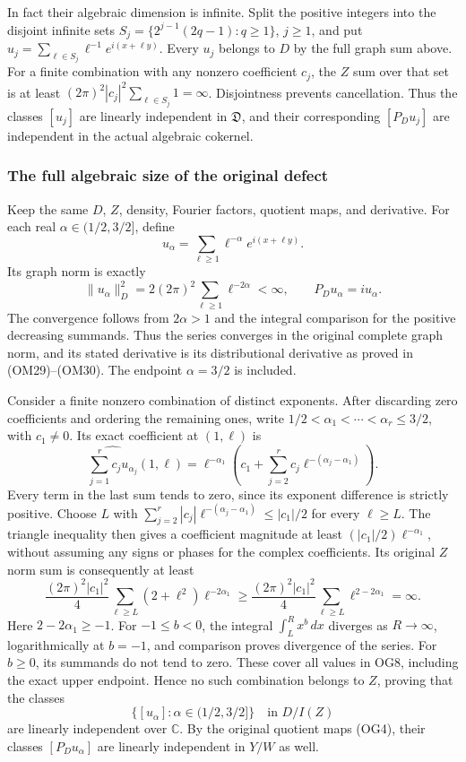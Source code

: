 \documentclass[
  11pt,
]{article}
\makeatletter
\let\ReaderOriginalAnchorStart\hyper@anchorstart
\let\ReaderOriginalAnchorEnd\hyper@anchorend
\let\ReaderPendingAliases\@empty
\def\ReaderArmAliases#1{\gdef\ReaderPendingAliases{#1}}
\def\hyper@anchorstart#1{\ReaderIfNativeAnchorTF{#1}{\ReaderPendingAliases\global\let\ReaderPendingAliases\@empty}{}\ReaderOriginalAnchorStart{#1}}
\makeatother
\begin{document}
In fact their algebraic dimension is infinite. Split the positive
integers into the disjoint infinite sets
\(S_j=\{2^{j-1}(2q-1):q\geq1\}\), \(j\geq1\), and put
\(u_j=\sum_{\ell\in S_j}\ell^{-1}e^{i(x+\ell y)}\). Every \(u_j\)
belongs to \(D\) by the full graph sum above. For a finite combination
with any nonzero coefficient \(c_j\), the \(Z\) sum over that set is at
least \((2\pi)^2|c_j|^2\sum_{\ell\in S_j}1=\infty\). Disjointness
prevents cancellation. Thus the classes \([u_j]\) are linearly
independent in \(\mathfrak D\), and their corresponding \([P_Du_j]\) are
independent in the actual algebraic cokernel.

\ReaderArmAliases{\ReaderOriginalAnchorStart{the-full-algebraic-size-of-the-original-defect}\ReaderOriginalAnchorEnd}
\subsubsection{The full algebraic size of the original
defect}\label{the-full-algebraic-size-of-the-original-defect}

Keep the same \(D\), \(Z\), density, Fourier factors, quotient maps, and
derivative. For each real \(\alpha\in(1/2,3/2]\), define \[
u_\alpha=\sum_{\ell\geq1}\ell^{-\alpha}e^{i(x+\ell y)}.
\tag{OG5}
\] Its graph norm is exactly \[
\|u_\alpha\|_D^2=2(2\pi)^2\sum_{\ell\geq1}\ell^{-2\alpha}<\infty,
\qquad P_Du_\alpha=i u_\alpha.
\tag{OG6}
\] The convergence follows from \(2\alpha>1\) and the integral
comparison for the positive decreasing summands. Thus the series
converges in the original complete graph norm, and its stated derivative
is its distributional derivative as proved in (OM29)--(OM30). The
endpoint \(\alpha=3/2\) is included.

Consider a finite nonzero combination of distinct exponents. After
discarding zero coefficients and ordering the remaining ones, write
\(1/2<\alpha_1<\cdots<\alpha_r\leq3/2\), with \(c_1\ne0\). Its exact
coefficient at \((1,\ell)\) is \[
\widehat{\sum_{j=1}^r c_ju_{\alpha_j}}(1,\ell)
=\ell^{-\alpha_1}
 \left(c_1+\sum_{j=2}^r c_j\ell^{-(\alpha_j-\alpha_1)}\right).
\tag{OG7}
\] Every term in the last sum tends to zero, since its exponent
difference is strictly positive. Choose \(L\) with
\(\sum_{j=2}^r|c_j|\ell^{-(\alpha_j-\alpha_1)}\leq|c_1|/2\) for every
\(\ell\geq L\). The triangle inequality then gives a coefficient
magnitude at least \((|c_1|/2)\ell^{-\alpha_1}\), without assuming any
signs or phases for the complex coefficients. Its original \(Z\) norm
sum is consequently at least \[
\frac{(2\pi)^2|c_1|^2}{4}
 \sum_{\ell\geq L}(2+\ell^2)\ell^{-2\alpha_1}
\geq\frac{(2\pi)^2|c_1|^2}{4}
 \sum_{\ell\geq L}\ell^{2-2\alpha_1}=\infty.
\tag{OG8}
\] Here \(2-2\alpha_1\geq-1\). For \(-1\leq b<0\), the integral
\(\int_L^R x^b\,dx\) diverges as \(R\to\infty\), logarithmically at
\(b=-1\), and comparison proves divergence of the series. For
\(b\geq0\), its summands do not tend to zero. These cover all values in
OG8, including the exact upper endpoint. Hence no such combination
belongs to \(Z\), proving that the classes \[
\{[u_\alpha]:\alpha\in(1/2,3/2]\}
\quad\text{in }D/I(Z)
\tag{OG9}
\] are linearly independent over \(\mathbb C\). By the original quotient
maps (OG4), their classes \([P_Du_\alpha]\) are linearly independent in
\(Y/W\) as well.
\end{document}
